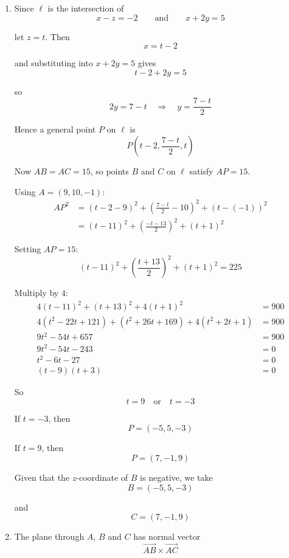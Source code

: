 \documentclass[leqno]{article}
\begin{document}
\begin{enumerate}[
  label=\textbf{\arabic*.},
  leftmargin=*,
  topsep=0pt,
  partopsep=0pt,
  parsep=0pt
]
\vspace*{10pt}

\begin{djsSolution}
\begin{enumerate}[label=\textbf{(\alph*)}]
\item Since $\ell$ is the intersection of
\[
x-z=-2
\qquad\text{and}\qquad
x+2y=5
\]

let $z=t$. Then
\[
x=t-2
\]

and substituting into $x+2y=5$ gives
\[
t-2+2y=5
\]

so
\[
2y=7-t
\quad\Longrightarrow\quad
y=\frac{7-t}{2}
\]

Hence a general point $P$ on $\ell$ is
\[
P\left(t-2,\frac{7-t}{2},t\right)
\]

Now $AB=AC=15$, so points $B$ and $C$ on $\ell$ satisfy $AP=15$.

Using $A=(9,10,-1)$:
\begin{align*}
AP^2
&=(t-2-9)^2+\left(\frac{7-t}{2}-10\right)^2+(t-(-1))^2\\
&=(t-11)^2+\left(\frac{-t-13}{2}\right)^2+(t+1)^2
\end{align*}

Setting $AP=15$:
\[
(t-11)^2+\left(\frac{t+13}{2}\right)^2+(t+1)^2=225
\]

Multiply by $4$:
\begin{align*}
4(t-11)^2+(t+13)^2+4(t+1)^2&=900\\
4(t^2-22t+121)+(t^2+26t+169)+4(t^2+2t+1)&=900\\
9t^2-54t+657&=900\\
9t^2-54t-243&=0\\
t^2-6t-27&=0\\
(t-9)(t+3)&=0
\end{align*}

So
\[
t=9 \quad \text{or} \quad t=-3
\]

If $t=-3$, then
\[
P=\left(-5,5,-3\right)
\]

If $t=9$, then
\[
P=\left(7,-1,9\right)
\]

Given that the $z$-coordinate of $B$ is negative, we take
\[
B=(-5,5,-3)
\]

and
\[
C=(7,-1,9)
\]

\item The plane through $A$, $B$ and $C$ has normal vector
\[
\overrightarrow{AB}\times\overrightarrow{AC}
\]


\end{enumerate}
\end{djsSolution}
\end{enumerate}
\end{document}
